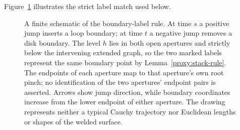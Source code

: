 Figure~\ref{fig:stack-labels} illustrates the strict label match used below.
\begin{figure}[htbp]
\centering

\caption{A finite schematic of the boundary-label rule. At time $s$ a positive jump inserts a loop boundary; at time $t$ a negative jump removes a disk boundary. The level $h$ lies in both open apertures and strictly below the intervening extended graph, so the two marked labels represent the same boundary point by Lemma~\ref{proxy:stack-rule}. The endpoints of each aperture map to that aperture's own root pinch; no identification of the two apertures' endpoint pairs is asserted. Arrows show jump direction, while boundary coordinates increase from the lower endpoint of either aperture. The drawing represents neither a typical Cauchy trajectory nor Euclidean lengths or shapes of the welded surface.}
\label{fig:stack-labels}
\end{figure}

